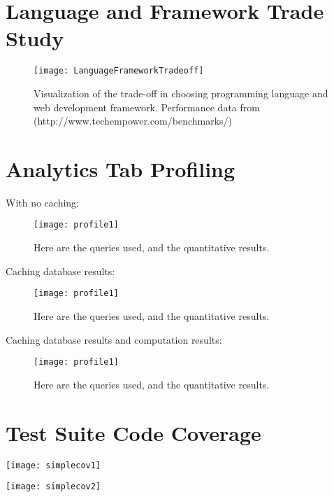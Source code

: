 \documentclass[12pt,letterpaper,titlepage]{article}
\begin{document}
\newpage
\section{Language and  Framework Trade Study} \label{tab:LanguageFrameworkAppendix}

\begin{figure}[h!]
\begin{center}
\texttt{[image: LanguageFrameworkTradeoff]}
\caption{Visualization of the trade-off in choosing programming language and web development framework. Performance data from (http://www.techempower.com/benchmarks/)}
\end{center}
\end{figure}

\newpage
\section{Analytics Tab Profiling} \label{AnalyticsTabProfiling}

With no caching:
\begin{figure}[h!]
\begin{center}
\texttt{[image: profile1]}
\caption{Here are the queries used, and the quantitative results.}
\end{center}
\end{figure}

\newpage
Caching database results:
\begin{figure}[h!]
\begin{center}
\texttt{[image: profile1]}
\caption{Here are the queries used, and the quantitative results.}
\end{center}
\end{figure}

\newpage
Caching database results and computation results:
\begin{figure}[h!]
\begin{center}
\texttt{[image: profile1]}
\caption{Here are the queries used, and the quantitative results.}
\end{center}
\end{figure}

\newpage
\section{Test Suite Code Coverage} \label{sec:AppendixTestCoverage}
\begin{centering}
  \texttt{[image: simplecov1]}
\end{centering}
\newpage
\begin{centering}
  \texttt{[image: simplecov2]}
\end{centering}
\end{document}
